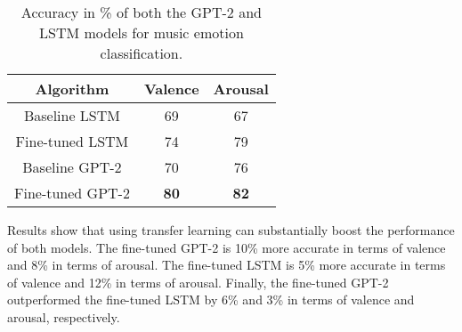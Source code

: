 \begin{table}[t!]
    \centering
    \begin{tabular}{ccc}
    \toprule
    \textbf{Algorithm} & \textbf{Valence} & \textbf{Arousal} \\
    \midrule
    Baseline LSTM & 69 & 67 \\
    Fine-tuned LSTM & 74 & 79 \\
    Baseline GPT-2 & 70 & 76 \\
    Fine-tuned GPT-2 & \textbf{80} & \textbf{82} \\
    \bottomrule
    \end{tabular}
    \caption{Accuracy in \% of both the GPT-2 and LSTM models for music emotion classification. }
    \label{tab:sent_accuracy}
\end{table}

Results show that using transfer learning can substantially boost the performance of both models. The fine-tuned GPT-2 is 10\% more accurate in terms of valence and 8\% in terms of arousal. The fine-tuned LSTM is 5\% more accurate in terms of valence and 12\% in terms of arousal. Finally, the fine-tuned GPT-2 outperformed the fine-tuned LSTM by 6\% and 3\% in terms of valence and arousal, respectively.

